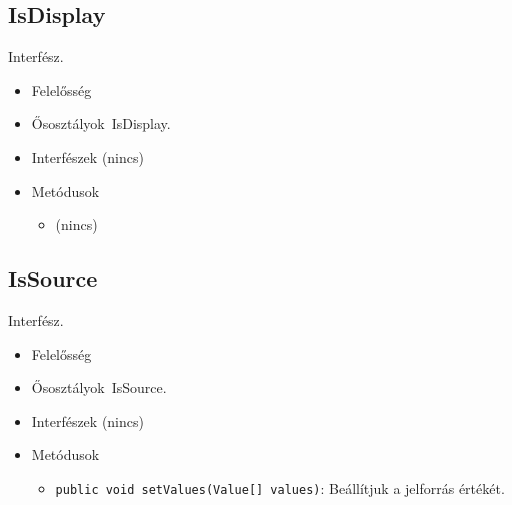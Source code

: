 \subsection{IsDisplay}
Interfész.
\begin{itemize}
\item Felelősség\\

\item Ősosztályok\ IsDisplay.
\item Interfészek (nincs)
\item Metódusok$\ $
\begin{itemize}
\item (nincs)
\end{itemize}
\end{itemize}

\subsection{IsSource}
Interfész.
\begin{itemize}
\item Felelősség\\

\item Ősosztályok\ IsSource.
\item Interfészek (nincs)
\item Metódusok$\ $
\begin{itemize}
	\item \texttt{public void setValues(Value[] values)}: Beállítjuk a jelforrás értékét.
\end{itemize}
\end{itemize}

